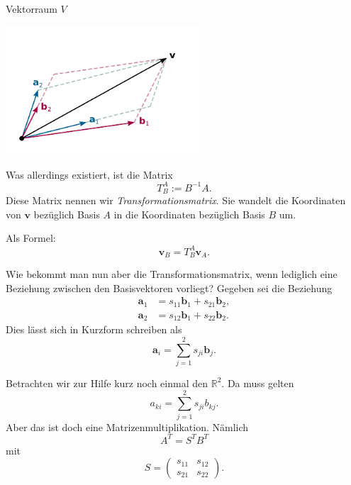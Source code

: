 \documentclass[9pt]{beamer}
\newcommand{\bv}[1]{\mathbf{#1}}
\newcommand{\R}{\mathbb R}
\newcommand{\parspace}{\vspace{0.8em}}
\newcommand{\basis}[1]{#1}
\begin{document}
\begin{frame}
\begin{center}Vektorraum $V$\end{center}

\vspace{-2em}
\begin{center}
\includegraphics[width=72mm]{img/Abstrakt-in-Basis-AB.pdf}
\end{center}
\end{frame}

\begin{frame}
Was allerdings existiert, ist die Matrix
\[T_{\basis B}^{\basis A} := B^{-1}A.\]\pause
Diese Matrix nennen wir \emph{Transformationsmatrix}. Sie wandelt die
Koordinaten von $\bv v$ bezüglich Basis $\basis A$ in die Koordinaten
bezüglich Basis $\basis B$ um.\pause

\parspace
Als Formel:
\[\bv v_{\basis B} = T_{\basis B}^{\basis A} \bv v_{\basis A}.\]
\end{frame}

\begin{frame}
Wie bekommt man nun aber die Transformationsmatrix, wenn lediglich
eine Beziehung zwischen den Basisvektoren vorliegt? Gegeben sei
die Beziehung
\begin{align*}
\bv a_1 &= s_{11}\bv b_1 + s_{21}\bv b_2,\\
\bv a_2 &= s_{12}\bv b_1 + s_{22}\bv b_2.
\end{align*}\pause
Dies lässt sich in Kurzform schreiben als
\[\bv a_i = \sum_{j=1}^2 s_{ji}\bv b_j.\]
\end{frame}

\begin{frame}
Betrachten wir zur Hilfe kurz noch einmal den $\R^2$.
Da muss gelten
\[a_{ki} = \sum_{j=1}^2 s_{ji}b_{kj}.\]\pause
Aber das ist doch eine Matrizenmultiplikation. Nämlich
\[A^T = S^T B^T\]
mit
\[S = \begin{pmatrix}s_{11} & s_{12}\\
s_{21} & s_{22}\end{pmatrix}.\]
\end{frame}
\end{document}
